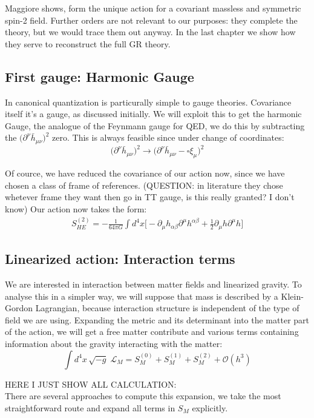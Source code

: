\documentclass[12pt,a4paper]{article}
\begin{document}
Maggiore shows, form the unique action for a covariant massless and symmetric spin-2 field. Further orders are not relevant to our purposes: they complete the theory, but we would trace them out anyway. In the last chapter we show how they serve to reconstruct the full GR theory.

\vspace{0.5cm}
\subsection*{First gauge: Harmonic Gauge}
In canonical quantization is particurally simple to gauge theories. Covariance itself it's a gauge, as discussed initially. We will exploit this to get the harmonic Gauge, the analogue of the Feynmann gauge for QED, we do this by subtracting the
$\big(\partial^\nu\bar{h}_{\mu\nu}\big)^2$ zero. This is always feasible since under change of coordinates:
\[
\big( \partial^\nu\bar{h}_{\mu\nu} \big) ^2 \rightarrow
\big( \partial^\nu\bar{h}_{\mu\nu} - \square \xi_\mu\big) ^2
\]

Of cource, we have reduced the covariance of our action now, since we have chosen a class of frame of references. (QUESTION: in literature they chose whetever frame they want then go in TT gauge, is this really granted? I don't know) Our action now takes the form:
\begin{align}
\boxed{
S^{(2)}_{HE}= -\frac{1}{64 \pi G} \int d^4x \bigl[
-\partial_\mu h_{\alpha\beta}\partial^\mu h^{\alpha\beta}
+ \frac{1}{2}\partial_\mu h \partial ^\mu h
\bigr]}
\end{align}



\subsection*{Linearized action: Interaction terms}
We are interested in interaction between matter fields and linearized gravity. To analyse this in a simpler way, we will suppose that mass is described by a Klein-Gordon Lagrangian, because interaction structure is independent of the type of field we are using. Expanding the metric and its determinant into the matter part of the action, we will get a free matter contribute and various terms containing information about the gravity interacting with the matter:
\[
\int d^4x \,\sqrt{-g} \; \mathcal{L}_M
= S_M^{(0)} + S_M^{(1)} + S_M^{(2)} + \mathcal{O}(h^3)
\]

\textsc{HERE I JUST SHOW ALL CALCULATION:}\\
There are several approaches to compute this expansion, we take the most straightforward route and expand all terms in $S_M$ explicitly.
\end{document}
